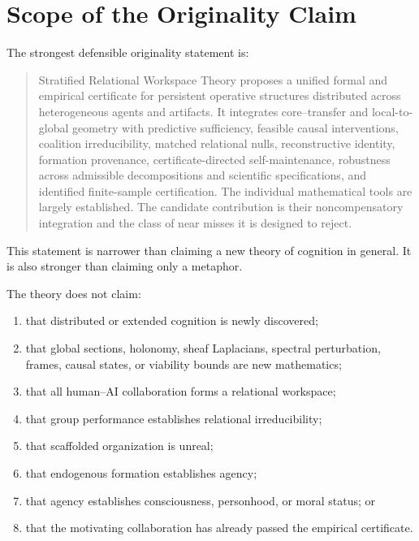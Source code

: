 \section{Scope of the Originality Claim}


The strongest defensible originality statement is:
\begin{quote}
Stratified Relational Workspace Theory proposes a unified formal and empirical
certificate for persistent operative structures distributed across
heterogeneous agents and artifacts. It integrates core--transfer and
local-to-global geometry with predictive sufficiency, feasible causal
interventions, coalition irreducibility, matched relational nulls,
reconstructive identity, formation provenance, certificate-directed
self-maintenance, robustness across admissible decompositions and scientific
specifications, and identified finite-sample certification. The individual
mathematical tools are largely established.
The candidate contribution is their noncompensatory integration and the class
of near misses it is designed to reject.
\end{quote}
This statement is narrower than claiming a new theory of cognition in general.
It is also stronger than claiming only a metaphor.


The theory does not claim:
\begin{enumerate}
\item that distributed or extended cognition is newly discovered;
\item that global sections, holonomy, sheaf Laplacians, spectral perturbation,
 frames, causal states, or viability bounds are new mathematics;
\item that all human--AI collaboration forms a relational workspace;
\item that group performance establishes relational irreducibility;
\item that scaffolded organization is unreal;
\item that endogenous formation establishes agency;
\item that agency establishes consciousness, personhood, or moral status; or
\item that the motivating collaboration has already passed the empirical
 certificate.
\end{enumerate}


